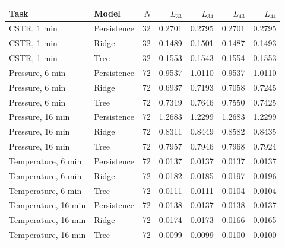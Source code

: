 \begin{tabular}{@{}llr@{\hspace{1em}}r@{\hspace{1em}}r@{\hspace{1em}}r@{\hspace{1em}}r@{}}
\toprule
Task & Model & $N$ & $L_{33}$ & $L_{34}$ & $L_{43}$ & $L_{44}$ \\
\midrule
CSTR, 1 min & Persistence & 32 & 0.2701 & 0.2795 & 0.2701 & 0.2795 \\
CSTR, 1 min & Ridge & 32 & 0.1489 & 0.1501 & 0.1487 & 0.1493 \\
CSTR, 1 min & Tree & 32 & 0.1553 & 0.1543 & 0.1554 & 0.1553 \\
Pressure, 6 min & Persistence & 72 & 0.9537 & 1.0110 & 0.9537 & 1.0110 \\
Pressure, 6 min & Ridge & 72 & 0.6937 & 0.7193 & 0.7058 & 0.7245 \\
Pressure, 6 min & Tree & 72 & 0.7319 & 0.7646 & 0.7550 & 0.7425 \\
Pressure, 16 min & Persistence & 72 & 1.2683 & 1.2299 & 1.2683 & 1.2299 \\
Pressure, 16 min & Ridge & 72 & 0.8311 & 0.8449 & 0.8582 & 0.8435 \\
Pressure, 16 min & Tree & 72 & 0.7957 & 0.7946 & 0.7968 & 0.7924 \\
Temperature, 6 min & Persistence & 72 & 0.0137 & 0.0137 & 0.0137 & 0.0137 \\
Temperature, 6 min & Ridge & 72 & 0.0182 & 0.0185 & 0.0197 & 0.0196 \\
Temperature, 6 min & Tree & 72 & 0.0111 & 0.0111 & 0.0104 & 0.0104 \\
Temperature, 16 min & Persistence & 72 & 0.0138 & 0.0137 & 0.0138 & 0.0137 \\
Temperature, 16 min & Ridge & 72 & 0.0174 & 0.0173 & 0.0166 & 0.0165 \\
Temperature, 16 min & Tree & 72 & 0.0099 & 0.0099 & 0.0100 & 0.0100 \\
\bottomrule
\end{tabular}
